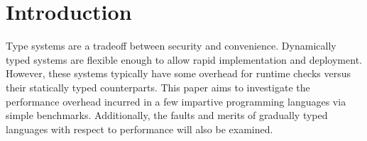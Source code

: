 \section{Introduction}
Type systems are a tradeoff between security and convenience. Dynamically typed systems are flexible enough to allow rapid implementation and deployment. However, these systems typically have some overhead for runtime checks versus their statically typed counterparts. This paper aims to investigate the  performance overhead incurred in a few impartive programming languages via simple benchmarks. Additionally, the faults and merits of gradually typed languages with respect to performance will also be examined.

